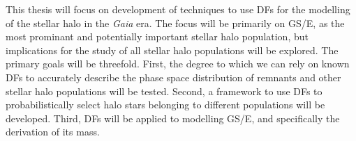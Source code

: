 This thesis will focus on development of techniques to use DFs for the modelling of the stellar halo in the \textit{Gaia} era. The focus will be primarily on GS/E, as the most prominant and potentially important stellar halo population, but implications for the study of all stellar halo populations will be explored. The primary goals will be threefold. First, the degree to which we can rely on known DFs to accurately describe the phase space distribution of remnants and other stellar halo populations will be tested. Second, a framework to use DFs to probabilistically select halo stars belonging to different populations will be developed. Third, DFs will be applied to modelling GS/E, and specifically the derivation of its mass.